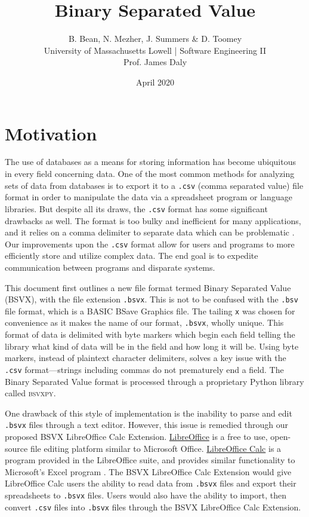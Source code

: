 \documentclass[10pt]{article}
\begin{document}
\title{Binary Separated Value}
\author{B. Bean, N. Mezher, J. Summers \& D. Toomey\\University of Massachusetts Lowell | Software Engineering II\\Prof. James Daly}
\date{April 2020}
\maketitle

\section*{Motivation}

The use of databases as a means for storing information has become ubiquitous in every field concerning data.
One of the most common methods for analyzing sets of data from databases is to export it to a \texttt{.csv} (comma separated value) file format in order to manipulate the data via a spreadsheet program or language libraries.
But despite all its draws, the \texttt{.csv} format has some significant drawbacks as well.
The format is too bulky and inefficient for many applications, and it relies on a comma delimiter to separate data which can be problematic \cite{Coleman2011}.
Our improvements upon the \texttt{.csv} format allow for users and programs to more efficiently store and utilize complex data.
The end goal is to expedite communication between programs and disparate systems.

\indent{}
This document first outlines a new file format termed Binary Separated Value (BSVX), with the file extension \texttt{.bsvx}.
This is not to be confused with the \texttt{.bsv} file format, which is a BASIC BSave Graphics file.
The tailing \texttt{x} was chosen for convenience as it makes the name of our format, \texttt{.bsvx}, wholly unique.
This format of data is delimited with byte markers which begin each field telling the library what kind of data will be in the field and how long it will be.
Using byte markers, instead of plaintext character delimiters, solves a key issue with the \texttt{.csv} format---strings including commas do not prematurely end a field.
The Binary Separated Value format is processed through a proprietary Python library called \textsc{bsvxpy}.

\indent{}
One drawback of this style of implementation is the inability to parse and edit \texttt{.bsvx} files through a text editor.
However, this issue is remedied through our proposed BSVX LibreOffice Calc Extension.
\href{https://www.libreoffice.org/discover/libreoffice/}{LibreOffice} is a free to use, open-source file editing platform similar to Microsoft Office.
\href{https://www.libreoffice.org/discover/calc/}{LibreOffice Calc} is a program provided in the LibreOffice suite, and provides similar functionality to Microsoft’s Excel program \cite{Guthrie2012}.
The BSVX LibreOffice Calc Extension would give LibreOffice Calc users the ability to read data from \texttt{.bsvx} files and export their spreadsheets to \texttt{.bsvx} files.
Users would also have the ability to import, then convert \texttt{.csv} files into \texttt{.bsvx} files through the BSVX LibreOffice Calc Extension.
\end{document}
